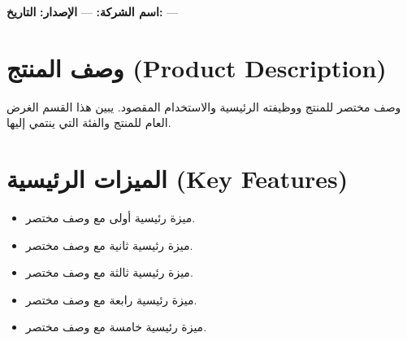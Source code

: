 \documentclass[11pt,a4paper]{article}
\begin{document}
\noindent
{}

\vspace{0.6em}

\noindent\textbf{اسم الشركة:} --- \hfill \textbf{الإصدار:}  \hfill \textbf{التاريخ:} ---

\vspace{0.8em}

\section{وصف المنتج (Product Description)}
وصف مختصر للمنتج ووظيفته الرئيسية والاستخدام المقصود. يبين هذا القسم الغرض
العام للمنتج والفئة التي ينتمي إليها.

\section{الميزات الرئيسية (Key Features)}
\begin{itemize}
    \item ميزة رئيسية أولى مع وصف مختصر.
    \item ميزة رئيسية ثانية مع وصف مختصر.
    \item ميزة رئيسية ثالثة مع وصف مختصر.
    \item ميزة رئيسية رابعة مع وصف مختصر.
    \item ميزة رئيسية خامسة مع وصف مختصر.
\end{itemize}

\end{document}

